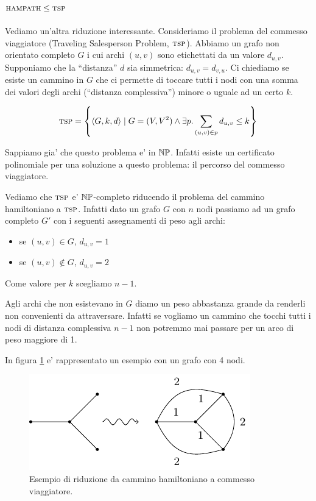 \subsection{$\textsc{hampath} \leq \textsc{tsp}$}

Vediamo un'altra riduzione interessante. Consideriamo il problema del commesso viaggiatore
(Traveling Salesperson Problem, $\textsc{tsp}$). Abbiamo un grafo non orientato completo $G$ i cui archi
$(u,v)$ sono etichettati da un valore $d_{u,v}$. Supponiamo che la ``distanza'' $d$ sia simmetrica:
$d_{u,v} = d_{v,u}$. Ci chiediamo se esiste un cammino in $G$ che ci permette di toccare tutti i
nodi con una somma dei valori degli archi (``distanza complessiva'') minore o uguale ad un certo
$k$.

\begin{equation*}
    \textsc{tsp} = \left\{\langle G,k,d \rangle \mid G = (V,V^{2}) \land \exists p. \sum_{(u,v)\in p}d_{u,v} \leq k\right\}
\end{equation*}

Sappiamo gia' che questo problema e' in $\mathbb{NP}$. Infatti esiste un certificato polinomiale per
una soluzione a questo problema: il percorso del commesso viaggiatore.

Vediamo che $\textsc{tsp}$ e' $\mathbb{NP}$-completo riducendo il problema del cammino hamiltoniano a $\textsc{tsp}$.
Infatti dato un grafo $G$ con $n$ nodi passiamo ad un grafo completo $G'$ con i seguenti
assegnamenti di peso agli archi:
\begin{itemize}
    \item se $(u,v) \in G$, $d_{u,v} = 1$ 
    \item se $(u,v) \notin G$, $d_{u,v} = 2$ 
\end{itemize}
Come valore per $k$ scegliamo $n-1$.

Agli archi che non esistevano in $G$ diamo un peso abbastanza grande da renderli non convenienti da
attraversare. Infatti se vogliamo un cammino che tocchi tutti i nodi di distanza complessiva $n-1$
non potremmo mai passare per un arco di peso maggiore di 1.

In figura \ref{img:HAMTSP} e' rappresentato un esempio con un grafo con 4 nodi.

\begin{figure}[h]
    \begin{center}
        \includegraphics{./img/NPClass/HAMTSP.pdf}
        \caption{Esempio di riduzione da cammino hamiltoniano a commesso viaggiatore.}
        \label{img:HAMTSP}
    \end{center}
\end{figure}

